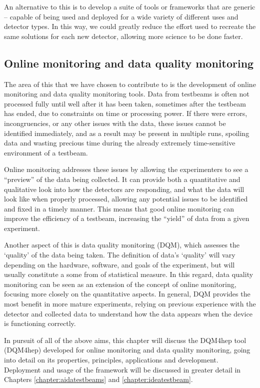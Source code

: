 An alternative to this is to develop a suite of tools or frameworks that are generic -- capable of being used and deployed for a wide variety of different uses and detector types. In this way, we could greatly reduce the effort used to recreate the same solutions for each new detector, allowing more science to be done faster.

\subsection*{Online monitoring and data quality monitoring}
The area of this that we have chosen to contribute to is the development of online monitoring and data quality monitoring tools. Data from testbeams is often not processed fully until well after it has been taken, sometimes after the testbeam has ended, due to constraints on time or processing power. If there were errors, incongruencies, or any other issues with the data, these issues cannot be identified immediately, and as a result may be present in multiple runs, spoiling data and wasting precious time during the already extremely time-sensitive environment of a testbeam.

Online monitoring addresses these issues by allowing the experimenters to see a ``preview'' of the data being collected. It can provide both a quantitative and qualitative look into how the detectors are responding, and what the data will look like when properly processed, allowing any potential issues to be identified and fixed in a timely manner. This means that good online monitoring can improve the efficiency of a testbeam, increasing the ``yield'' of data from a given experiment.

Another aspect of this is data quality monitoring (\acrshort{DQM}), which assesses the `quality' of the data being taken. The definition of data's `quality' will vary depending on the hardware, software, and goals of the experiment, but will usually constitute a some from of statistical measure. In this regard, data quality monitoring can be seen as an extension of the concept of online monitoring, focusing more closely on the quantitative aspects. In general, \acrshort{DQM} provides the most benefit in more mature experiments, relying on previous experience with the detector and collected data to understand how the data appears when the device is functioning correctly.  

In pursuit of all of the above aims, this chapter will discuss the \acrlong{DQM4hep} tool (\acrshort{DQM4hep}) developed for online monitoring and data quality monitoring, going into detail on its properties, principles, applications and development. Deployment and usage of the framework will be discussed in greater detail in Chapters \ref{chapter:aidatestbeams} and \ref{chapter:ideatestbeam}.

